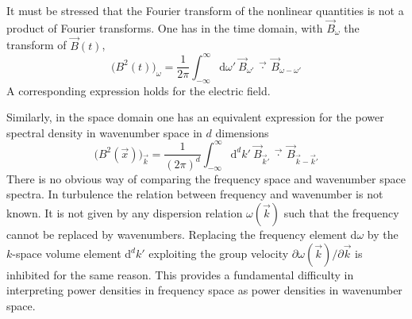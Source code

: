 \documentclass[ ]{copernicus2}
\begin{document}
{It must be stressed that the Fourier transform of the nonlinear quantities is not a product of Fourier transforms. One has in the time domain, with $\vec{B}_\omega$ the transform of $\vec{B}(t)$,
\begin{equation}
\big(B^2(t)\big)_\omega=\frac{1}{2\pi}\int_{-\infty}^\infty \mathrm{d}\omega'\:\vec{B}_{\omega'}\ \vec{\cdot}\ \vec{B}_{\omega-\omega'}
\end{equation}
A corresponding expression holds for the electric field.

Similarly, in the space domain one has an equivalent expression for the power spectral density in wavenumber space in $d$ dimensions
\begin{equation}
\big(B^2(\vec{x})\big)_{\vec{k}}=\frac{1}{(2\pi)^d}\int_{-\infty}^\infty \mathrm{d}^dk'\:\vec{B}_{\vec{k}'}\ \vec{\cdot}\ \vec{B}_{\vec{k}-\vec{k}'}
\end{equation}
There is no obvious way of comparing the frequency space and wavenumber space spectra. In turbulence the relation between frequency and wavenumber is not known. It is not given by any dispersion relation $\omega(\vec{k})$ such that the frequency cannot be replaced by wavenumbers. Replacing the frequency element d$\omega$ by the $k$-space volume element d$^dk'$ exploiting the group velocity $\partial\omega(\vec{k})/\partial\vec{k}$ is inhibited for the same reason. {This provides a fundamental difficulty in interpreting power densities in frequency space as power densities in wavenumber space.}


}
\end{document}
